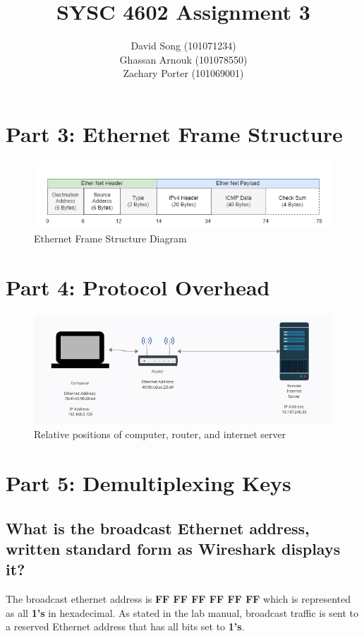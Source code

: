 \documentclass{article}
\begin{document}
    \title  { \textbf{SYSC 4602 Assignment 3} }
    \author {
        David Song (101071234)\\
        Ghassan Arnouk (101078550)\\
        Zachary Porter (101069001)
    }
     
    \maketitle
    
    \clearpage
    \section*{Part 3: Ethernet Frame Structure}
    \begin{figure}[htbp]
        \centering
        \includegraphics[width=\textwidth]{images/assignment3-part3.drawio.png}
        \caption{Ethernet Frame Structure Diagram}
    \end{figure}
    \section*{Part 4: Protocol Overhead}
    \begin{figure}[htbp]
        \centering
        \includegraphics[width=\linewidth]{images/part4.png}
        \caption{Relative positions of computer, router, and internet server}
    \end{figure}
    \section*{Part 5: Demultiplexing Keys}
    \subsection*{What is the broadcast Ethernet address, written standard form as Wireshark displays it?}
    The broadcast ethernet address is {\bfseries FF FF FF FF FF FF} which is represented as all {\bfseries 1's} in hexadecimal.
    As stated in the lab manual, broadcast traffic is sent to a reserved Ethernet address that has all bits set to {\bfseries 1's}.
    \clearpage
\end{document}
